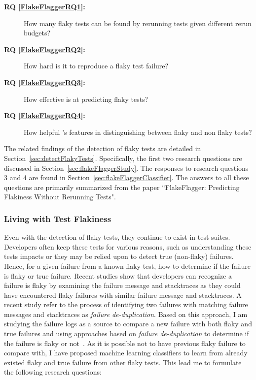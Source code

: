 \begin{description}
\item[\textbf{RQ \ref{FlakeFlaggerRQ1}:}]
How many flaky tests can be found by rerunning tests given different rerun budgets?
\item[\textbf{RQ \ref{FlakeFlaggerRQ2}:}] 
How hard is it to reproduce a flaky test failure? 

\item[\textbf{RQ \ref{FlakeFlaggerRQ3}:}] How effective is \sysName at predicting flaky tests?
\item[\textbf{RQ \ref{FlakeFlaggerRQ4}:}] How helpful \sysName's features in distinguishing between flaky and non flaky tests?


\end{description}

The related findings of the detection of flaky tests are detailed in Section~\ref{sec:detectFlakyTests}. Specifically, the first two research questions are discussed in Section~\ref{sec:flakeFlaggerStudy}. The responses to research questions 3 and 4 are found in Section~\ref{sec:flakeFlaggerClassifier}. The answers to all these questions are primarily summarized from the paper ``FlakeFlagger: Predicting Flakiness Without Rerunning Tests"\cite{alshammari2021flakeflagger}.



\subsubsection{Living with Test Flakiness}
Even with the detection of flaky tests, they continue to exist in test suites. Developers often keep these tests for various reasons, such as understanding these tests impacts or they may be relied upon to detect true (non-flaky) failures. 
Hence, for a given failure from a known flaky test, how to determine if the failure is flaky or true failure. Recent studies show that developers can recognize a failure is flaky by examining the failure message and stacktraces as they could have encountered flaky failures with similar failure message and stacktraces\cite{gradlePreventingFlaky}. A recent study refer to the process of identifying two failures with matching failure messages and stacktraces as \emph{failure de-duplication}. Based on this approach, I am studying the failure logs as a source to compare a new failure with both flaky and true failures and using approaches based on \emph{failure de-duplication} to determine if the failure is flaky or not~\cite{Podgurski03Automated,Jiang17WhatCauses}. As it is possible not to have previous flaky failure to compare with, I have proposed machine learning classifiers to learn from already existed flaky and true failure from other flaky tests. This lead me to formulate the following research questions:


